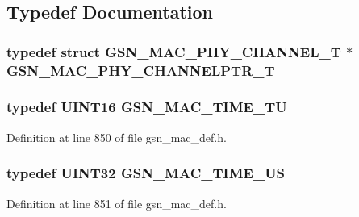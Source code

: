 \subsection{Typedef Documentation}
\hypertarget{a00522_a09016ea9c6e5a2b13064da85e1b4b5ba}{
\subsubsection[{GSN\_\-MAC\_\-PHY\_\-CHANNELPTR\_\-T}]{\setlength{\rightskip}{0pt plus 5cm}typedef  struct {\bf GSN\_\-MAC\_\-PHY\_\-CHANNEL\_\-T} $\ast$ {\bf GSN\_\-MAC\_\-PHY\_\-CHANNELPTR\_\-T}}}
\label{a00522_a09016ea9c6e5a2b13064da85e1b4b5ba}
\hypertarget{a00522_a4357e93aba9b5a4deb42a1b85eb03053}{
\subsubsection[{GSN\_\-MAC\_\-TIME\_\-TU}]{\setlength{\rightskip}{0pt plus 5cm}typedef {\bf UINT16} {\bf GSN\_\-MAC\_\-TIME\_\-TU}}}
\label{a00522_a4357e93aba9b5a4deb42a1b85eb03053}


Definition at line 850 of file gsn\_\-mac\_\-def.h.

\hypertarget{a00522_a9913c71e1c3b2be07fb0c41b585087ad}{
\subsubsection[{GSN\_\-MAC\_\-TIME\_\-US}]{\setlength{\rightskip}{0pt plus 5cm}typedef {\bf UINT32} {\bf GSN\_\-MAC\_\-TIME\_\-US}}}
\label{a00522_a9913c71e1c3b2be07fb0c41b585087ad}


Definition at line 851 of file gsn\_\-mac\_\-def.h.

